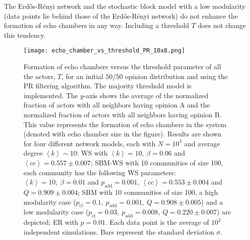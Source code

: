 \documentclass[11 pt , letterpaper , twoside , openright]{book}
\begin{document}
\newline
The Erd\H{o}s-R\'{e}nyi network and the stochastic block model with a low modularity (data points lie behind those of the Erd\H{o}s-R\'{e}nyi network) do not enhance the formation of echo chambers in any way. Including a threshold $T$ does not change this tendency. %
\begin{figure}[H]
	\texttt{[image: echo\_chamber\_vs\_threshold\_PR\_10x8.png]}
	\captionsetup{format=plain}
	\caption[Formation of echo chambers versus the threshold parameter of all the actors, $T$, for the PR filtering algorithm and an initial $50/50$ opinion distribution. The majority threshold model is implemented.]{Formation of echo chambers versus the threshold parameter of all the actors, $T$, for an initial $50/50$ opinion distribution and using the PR filtering algorithm. The majority threshold model is implemented. The $y$-axis shows the average of the normalized fraction of actors with all neighbors having opinion A and the normalized fraction of actors with all neighbors having opinion B. This value represents the formation of echo chambers in the system (denoted with echo chamber size in the figure). Results are shown for four different network models, each with $N=10^3$ and average degree $\left<k\right> \sim 10$: WS with $\left<k\right> =10,\ \beta = 0.06$ and $\left<cc\right> = 0.557 \pm 0.007$; SBM-WS with 10 communities of size 100, each community has the following WS parameters: $\left<k\right> = 10,\ \beta = 0.01$ and $p_{\text{add}} = 0.001$, $\left<cc\right> = 0.553 \pm 0.004$ and $Q = 0.909 \pm 0.004$; SBM with 10 communities of size 100, a high modularity case ($p_{\text{cl}} = 0.1,\ p_{\text{add}} = 0.001,\ Q = 0.908 \pm 0.005$) and a low modularity case ($p_{\text{cl}} = 0.03,\ p_{\text{add}} = 0.008,\ Q = 0.220 \pm 0.007$) are depicted; ER with $p= 0.01$. Each data point is the average of $10^2$ independent simulations. Bars represent the standard deviation $\sigma$.}
\label{echo_vs_threshold_PR}
\end{figure}
\noindent
\end{document}
